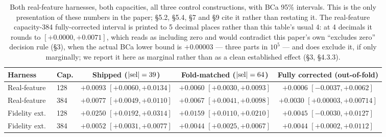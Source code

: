 \documentclass[10pt]{article} %
\begin{document}
\begin{table}[!ht]
\centering
\small
\begin{tabular}{llccc}
\toprule
Harness & Cap. & Shipped ($|{\rm sel}|=39$) & Fold-matched ($|{\rm sel}|=64$) & Fully corrected (out-of-fold) \\
\midrule
Real-feature & 128 & $+0.0093$ $[+0.0060,+0.0134]$ & $+0.0060$ $[+0.0030,+0.0093]$ & $+0.0006$ $[-0.0037,+0.0062]$ \\
Real-feature & 384 & $+0.0077$ $[+0.0049,+0.0110]$ & $+0.0067$ $[+0.0041,+0.0098]$ & $+0.0030$ $[+0.00003,+0.00714]$ \\
Fidelity ext.\ & 128 & $+0.0250$ $[+0.0192,+0.0314]$ & $+0.0159$ $[+0.0110,+0.0210]$ & $+0.0045$ $[-0.0030,+0.0127]$ \\
Fidelity ext.\ & 384 & $+0.0052$ $[+0.0031,+0.0077]$ & $+0.0044$ $[+0.0025,+0.0067]$ & $+0.0044$ $[+0.0002,+0.0112]$ \\
\bottomrule
\end{tabular}
\caption{Both real-feature harnesses, both capacities, all three control
constructions, with BCa 95\% intervals. This is the only presentation of these
numbers in the paper; §5.2, §5.4, §7 and §9 cite it rather than restating it.
The real-feature capacity-384 fully-corrected interval is printed to 5 decimal
places rather than this table's usual 4: at 4 decimals it rounds to
$[+0.0000,+0.0071]$, which reads as including zero and would contradict this
paper's own ``excludes zero'' decision rule (§3), when the actual BCa lower
bound is $+0.00003$ --- three parts in $10^5$ --- and does exclude it, if only
marginally; we report it here as marginal rather than as a clean established
effect (§3, §4.3.3).}
\label{tab:m3-real}
\end{table}
\end{document}
